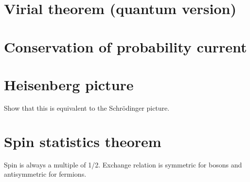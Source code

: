 \documentclass[12pt]{article}
\begin{document}
\section{Virial theorem (quantum version)}

\section{Conservation of probability current}

\section{Heisenberg picture}
Show that this is equivalent to the Schrödinger picture.

\section{Spin statistics theorem}
Spin is always a multiple of 1/2. Exchange relation is symmetric for bosons and antisymmetric for fermions.
\end{document}
